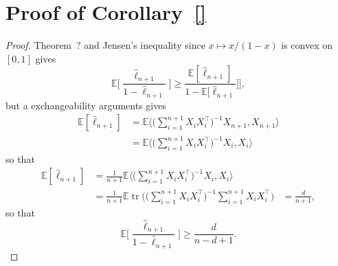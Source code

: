\documentclass[
	fontsize=11pt, %
	twoside=false, %
	numbers=noenddot, %
]{kaobook}
\DeclareMathOperator{\tr}{tr}
\newcommand{\E}{\mathbb E}
\newcommand{\wh}{\widehat}
\begin{document}
\section{Proof of Corollary~\ref{}} %
\label{sec:proof_of_corollary_}

\begin{proof}
	Theorem~? and Jensen's inequality since $x \mapsto x / (1-x)$ is convex on $[0, 1]$ gives
	\begin{equation*}
		\E \Big[ \frac{\wh \ell_{n+1}}{1 - \wh \ell_{n+1}} \Big] \geq \frac{\E[\wh \ell_{n+1}]}{1 - \E[\wh \ell_{n+1}}] \Big],
	\end{equation*}
	but a exchangeability arguments gives
	\begin{align*}
		\E [\wh \ell_{n + 1}] &= \E \Big \langle \Big( \sum_{i=1}^{n+1} X_i X_i^\top 
		\Big)^{-1} X_{n+1}, X_{n+1} \Big \rangle \\
		&= \E \Big \langle \Big( \sum_{i=1}^{n+1} X_i X_i^\top \Big)^{-1} X_{i}, X_{i} \Big \rangle
	\end{align*}
	so that
	\begin{align*}
	 	\E [\wh \ell_{n + 1}] &= \frac{1}{n+1} \E \Big \langle \Big( \sum_{i=1}^{n+1} X_i X_i^\top \Big)^{-1} X_{i}, X_{i} \Big \rangle \\
	 	&= \frac{1}{n+1}  \E \tr \bigg( \Big( \sum_{i=1}^{n+1} X_i X_i^\top \Big)^{-1} \sum_{i=1}^{n+1} X_i X_i^\top \bigg) 
	 	&= \frac{d}{n + 1},
	 \end{align*}
	so that
	\begin{equation*}
		\E \Big[ \frac{\wh \ell_{n+1}}{1 - \wh \ell_{n+1}} \Big] \geq \frac{d}{n - d + 1}.
	\end{equation*}
\end{proof}









\printbibliography[heading=bibintoc, title=Bibliography] %
\end{document}
